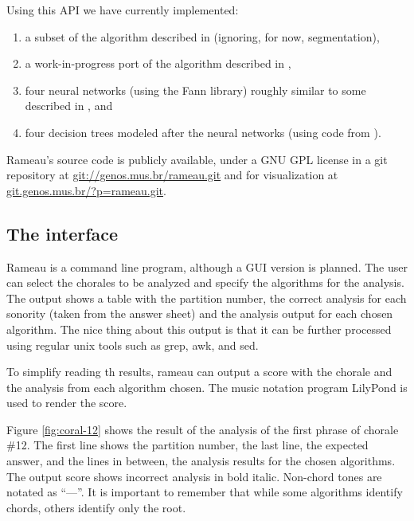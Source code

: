 \documentclass{article}
\begin{document}
Using this API we have currently implemented:

\begin{enumerate}
\item a subset of the algorithm described in \cite{pardo.ea:algorithms}
  (ignoring, for now, segmentation), 
\item a work-in-progress port of the algorithm described in
  \cite{temperley.ea:modeling}, 
\item four neural networks (using the Fann \cite{nissen:fann}
  library) roughly similar to some described in
  \cite{tsui:harmonic}, and
\item four decision trees modeled after the neural networks (using code
  from \cite{mitchell:machine}).
\end{enumerate}

Rameau's source code is publicly available, under a GNU GPL
\cite{fsf:gpl} license in a git \cite{baudis:git}
repository at \url{git://genos.mus.br/rameau.git} and for
visualization at \url{git.genos.mus.br/?p=rameau.git}.

\subsection{The interface}
\label{sec:analysis-output}

Rameau is a command line program, although a GUI version is planned.
The user can select the chorales to be analyzed and specify the
algorithms for the analysis. The output shows a table with the
partition number, the correct analysis for each sonority (taken from
the answer sheet) and the analysis output for each chosen algorithm.
The nice thing about this output is that it can be further processed
using regular unix tools such as grep, awk, and sed.

To simplify reading th results, rameau can output a score with the
chorale and the analysis from each algorithm chosen. The music
notation program LilyPond \cite{nienhuys.ea:lilypond} is used to
render the score.

Figure \ref{fig:coral-12} shows the result of the analysis of the
first phrase of chorale \#12. The first line shows the partition
number, the last line, the expected answer, and the lines in between,
the analysis results for the chosen algorithms. The output score shows
incorrect analysis in bold italic. Non-chord tones are notated as
``—''. It is important to remember that while some algorithms identify
chords, others identify only the root.
\end{document}
